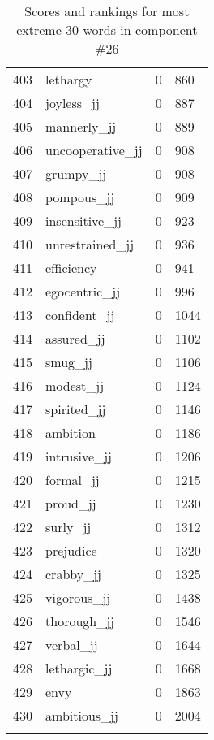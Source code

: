 \begin{longtable}[!htbp]{| rlr@{.}l |}
    403 & lethargy & 0 & 860 \\
    404 & joyless\_jj & 0 & 887 \\
    405 & mannerly\_jj & 0 & 889 \\
    406 & uncooperative\_jj & 0 & 908 \\
    407 & grumpy\_jj & 0 & 908 \\
    408 & pompous\_jj & 0 & 909 \\
    409 & insensitive\_jj & 0 & 923 \\
    410 & unrestrained\_jj & 0 & 936 \\
    411 & efficiency & 0 & 941 \\
    412 & egocentric\_jj & 0 & 996 \\
    413 & confident\_jj & 0 & 1044 \\
    414 & assured\_jj & 0 & 1102 \\
    415 & smug\_jj & 0 & 1106 \\
    416 & modest\_jj & 0 & 1124 \\
    417 & spirited\_jj & 0 & 1146 \\
    418 & ambition & 0 & 1186 \\
    419 & intrusive\_jj & 0 & 1206 \\
    420 & formal\_jj & 0 & 1215 \\
    421 & proud\_jj & 0 & 1230 \\
    422 & surly\_jj & 0 & 1312 \\
    423 & prejudice & 0 & 1320 \\
    424 & crabby\_jj & 0 & 1325 \\
    425 & vigorous\_jj & 0 & 1438 \\
    426 & thorough\_jj & 0 & 1546 \\
    427 & verbal\_jj & 0 & 1644 \\
    428 & lethargic\_jj & 0 & 1668 \\
    429 & envy & 0 & 1863 \\
    430 & ambitious\_jj & 0 & 2004 \\
    \hline
    \caption{Scores and rankings for most extreme 30 words in component \#26} \\
\end{longtable}
